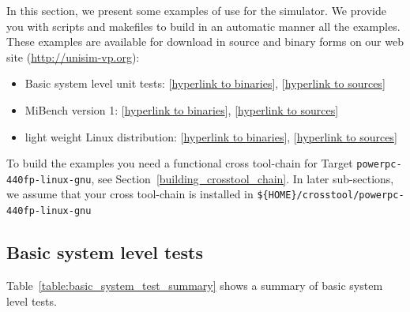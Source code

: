 In this section, we present some examples of use for the simulator.
We provide you with scripts and makefiles to build in an automatic manner all the examples.
These examples are available for download in source and binary forms on our web site (\url{http://unisim-vp.org}):
\begin{itemize}
\item Basic system level unit tests: [\href{http://unisim-vp.org/site/downloads/virtual-platforms/powerpc/virtex5fxt/unisim-virtex5fxt-basic-system-level-unit-tests-bin-v2.tar.gz}{hyperlink to binaries}], [\href{http://unisim-vp.org/site/downloads/virtual-platforms/powerpc/virtex5fxt/unisim-virtex5fxt-basic-system-level-unit-tests-source-v2.tar.gz}{hyperlink to sources}]
\item MiBench version 1: [\href{http://unisim-vp.org/site/downloads/other/benchmarks/mibench/mibench-v1-bin-powerpc-440fp-linux-gnu-v2.tar.gz}{hyperlink to binaries}], [\href{http://unisim-vp.org/site/downloads/other/benchmarks/mibench/mibench-v1-source-v2.tar.gz}{hyperlink to sources}]
\item light weight Linux distribution: [\href{http://unisim-vp.org/site/downloads/other/benchmarks/linux-distro/unisim-virtex5fxt-linux-distro-bin-v2.tar.gz}{hyperlink to binaries}], [\href{http://unisim-vp.org/site/downloads/other/benchmarks/linux-distro/unisim-virtex5fxt-linux-distro-source-v2.tar.gz}{hyperlink to sources}]
\end{itemize}

To build the examples you need a functional cross tool-chain for Target \texttt{powerpc-440fp-linux-gnu}, see Section~\ref{building_crosstool_chain}.
In later sub-sections, we assume that your cross tool-chain is installed in \texttt{\$\{HOME\}/crosstool/powerpc-440fp-linux-gnu}

\subsection{Basic system level tests}

Table~\ref{table:basic_system_test_summary} shows a summary of basic system level tests.

